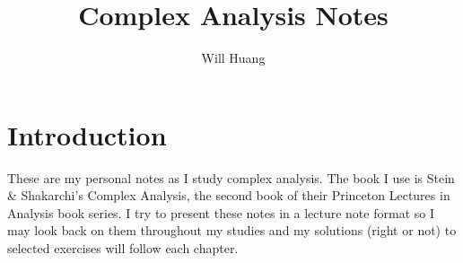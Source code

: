 \documentclass[12pt]{article}
\begin{document}
\title{Complex Analysis Notes}
\author{Will Huang}
\maketitle
\tableofcontents

\newpage 

\section{Introduction}
These are my personal notes as I study complex analysis. The book I use is Stein \& Shakarchi's Complex Analysis, the second book of their Princeton Lectures in Analysis book series. I try to present these notes in a lecture note format so I may look back on them throughout my studies and my solutions (right or not) to selected exercises will follow each chapter.


\end{document}
